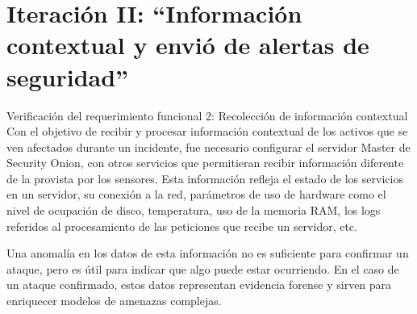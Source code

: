 \chapter{\Large Iteración II: “Información contextual y envió de alertas de seguridad”}
\begin{section}{Verificación del requerimiento funcional 2: Recolección de información contextual}
    Con el objetivo de recibir y procesar información contextual de los activos que se ven afectados durante un incidente, fue necesario configurar el servidor Master de Security Onion, con otros servicios que permitieran recibir información diferente de la provista por los sensores. Esta información refleja el estado de los servicios en un servidor, su conexión a la red, parámetros de uso de hardware como el nivel de ocupación de disco, temperatura, uso de la memoria RAM, los logs referidos al procesamiento de las peticiones que recibe un servidor, etc. \par
    Una anomalía en los datos de esta información no es suficiente para confirmar un ataque, pero es útil para indicar que algo puede estar ocurriendo. En el caso de un ataque confirmado, estos datos representan evidencia forense y sirven para enriquecer modelos de amenazas complejas. \par
   

\end{section}

